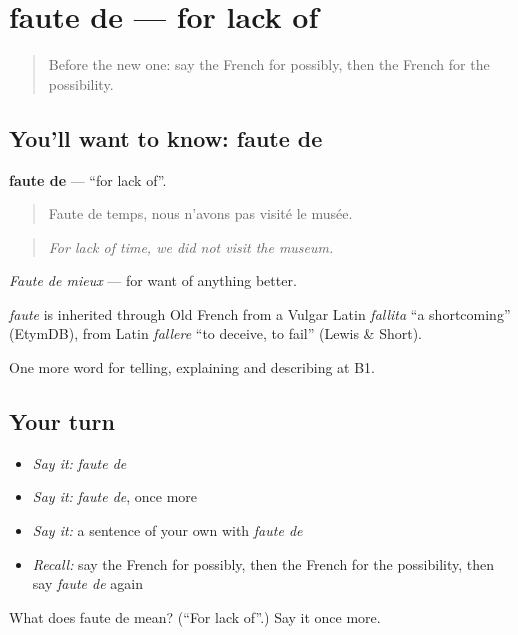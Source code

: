 \section[faute de]{faute de — for lack of}

\label{lesson:FR-C369-faute-de}



\begin{quote}
Before the new one: say the French for possibly, then the French for the possibility.
\end{quote}

\subsection*{You'll want to know: faute de}
\textbf{faute de} — \textquotedblleft{}for lack of\textquotedblright{}.

\begin{quote}
Faute de temps, nous n'avons pas visité le musée.
\end{quote}

\begin{quote}
\emph{For lack of time, we did not visit the museum.}
\end{quote}

\emph{Faute de mieux} — for want of anything better.

\begin{cousinweb}
\emph{faute} is inherited through Old French from a Vulgar Latin \emph{fallita} \textquotedblleft{}a shortcoming\textquotedblright{} (EtymDB), from Latin \emph{fallere} \textquotedblleft{}to deceive, to fail\textquotedblright{} (Lewis \& Short).
\end{cousinweb}

\begin{grammarlens}[title={What you've built}]
One more word for telling, explaining and describing at B1.
\end{grammarlens}

\subsection*{Your turn}
\begin{itemize}
\raggedright
  \item \emph{Say it:} \emph{faute de}
  \item \emph{Say it:} \emph{faute de}, once more
  \item \emph{Say it:} a sentence of your own with \emph{faute de}
  \item \emph{Recall:} say the French for possibly, then the French for the possibility, then say \emph{faute de} again
\end{itemize}

\begin{tcolorbox}[breakable,colback=teal!4,colframe=teal!35!black,title={Before you move on}]
What does faute de mean? (\textquotedblleft{}For lack of\textquotedblright{}.) Say it once more.
\end{tcolorbox}
